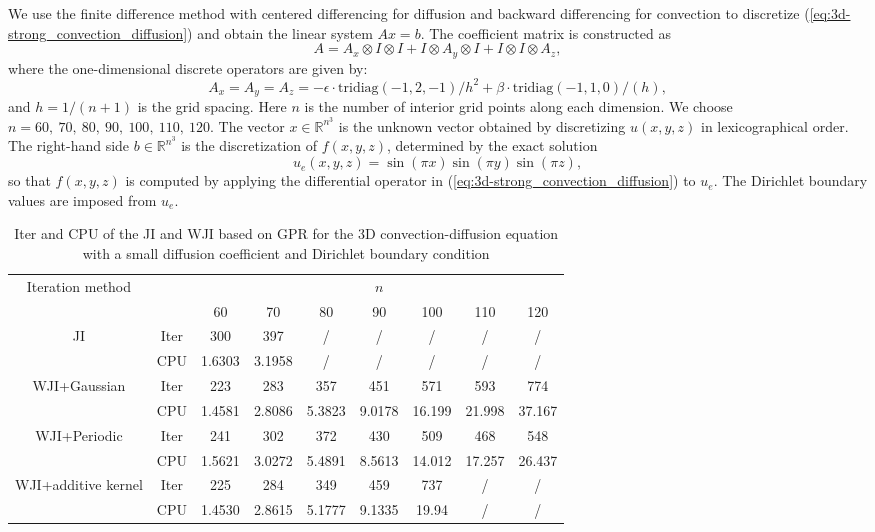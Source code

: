 \documentclass[preprint,review,sort&compress,3p]{elsarticle}
\begin{document}
We use the finite difference method with centered differencing for diffusion and backward differencing for convection to discretize (\ref{eq:3d-strong_convection_diffusion}) and obtain the linear system $Ax = b$. The coefficient matrix is constructed as
\[
A = A_x \otimes I \otimes I + I \otimes A_y \otimes I + I \otimes I \otimes A_z,
\]
where the one-dimensional discrete operators are given by:
\[
A_x = A_y = A_z = -\epsilon\cdot\text{tridiag}(-1, 2, -1)/h^2 + \beta\cdot\text{tridiag}(-1, 1, 0)/(h),
\]
and $h = 1/(n+1)$ is the grid spacing. Here $n$ is the number of interior grid points along each dimension. We choose $n = 60,~70,~ 80,~90,~100,~110,~120$. The vector $x \in \mathbb{R}^{n^3}$ is the unknown vector obtained by discretizing $u(x,y,z)$ in lexicographical order. The right-hand side $b \in \mathbb{R}^{n^3}$ is the discretization of $f(x,y,z)$, determined by the exact solution
\[
u_e(x,y,z) = \sin(\pi x)\sin(\pi y)\sin(\pi z),
\]
so that $f(x,y,z)$ is computed by applying the differential operator in (\ref{eq:3d-strong_convection_diffusion}) to $u_e$. The Dirichlet boundary values are imposed from $u_e$.

\begin{table}[htbp!]
	\caption{Iter and CPU of the JI and WJI based on GPR for { the 3D convection-diffusion equation with a small diffusion coefficient and Dirichlet boundary condition} }
	\label{Tab:3d_strong_convection_diffusion}
	\centering
	\begin{tabular}{ccccccccc}
		\hline
		\multirow{2}{*}{Iteration method} &     & \multicolumn{7}{c}{$n$}           \\
		\cline{3-9} 
		&     & 60    & 70   & 80 & 90  & 100 & 110 & 120 \\ 
		\hline
		\multirow{2}{*}{JI}           & Iter  & 300 & 397 & /& /& / & / & / \\
		\cline{2-9} 
		& CPU & 1.6303 &  3.1958  & / &/ & / & / & / \\  \hline
		\multirow{2}{*}{{ WJI+Gaussian}}         & Iter  & 223    & 283 &357& 451 & 571 &593 & 774 \\ 
		\cline{2-9} 
		& CPU & 1.4581 &2.8086  & 5.3823 &9.0178&16.199& 21.998 & 37.167 \\ 
		\hline
		\multirow{2}{*}{{ WJI+Periodic}}         & Iter  &  241   &  302 & 372 & 430 &509& 468 &548  \\ 
		\cline{2-9} 
		& CPU & 1.5621 & 3.0272 & 5.4891 &8.5613& 14.012 & 17.257 & 26.437  \\ 
		\hline
		\multirow{2}{*}{{ WJI+additive kernel}}         & Iter  &  225 &284  & 349 & 459 & 737 & /  & / \\ 
		\cline{2-9} 
		& CPU & 1.4530 & 2.8615 & 5.1777 & 9.1335&  19.94 &  / & /  \\ 
		\hline
	\end{tabular}
\end{table}
\end{document}
